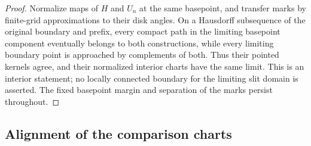 \begin{proof}
Normalize maps of $H$ and $U_n$ at the same basepoint, and transfer
marks by finite-grid approximations to their disk angles.  On a
Hausdorff subsequence of the original boundary and prefix, every
compact path in the limiting basepoint component eventually belongs
to both constructions, while every limiting boundary point is
approached by complements of both.  Thus their pointed kernels agree,
and their normalized interior charts have the same limit.  This is
an interior statement; no locally connected boundary for the
limiting slit domain is asserted.  The fixed basepoint margin and
separation of the marks persist throughout.
\end{proof}

\subsection{Alignment of the comparison charts}


